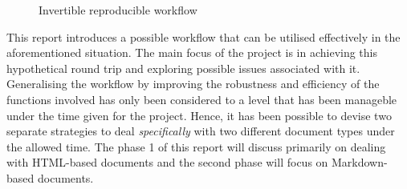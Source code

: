 \documentclass[a4paper, 12pt]{report}
\begin{document}
\begin{figure}[h]
\centering
  \caption{Invertible reproducible workflow}
  \label{fig:2}
\end{figure}

This report introduces a possible workflow that can be utilised effectively in the aforementioned situation. The main focus of the project is in achieving this hypothetical round trip and exploring possible issues associated with it. Generalising the workflow by improving the robustness and efficiency of the functions involved has only been considered to a level that has been manageble under the time given for the project. Hence, it has been possible to devise two separate strategies to deal \emph{specifically} with two different document types under the allowed time. The phase 1 of this report will discuss primarily on dealing with HTML-based documents and the second phase will focus on Markdown-based documents.
\end{document}
